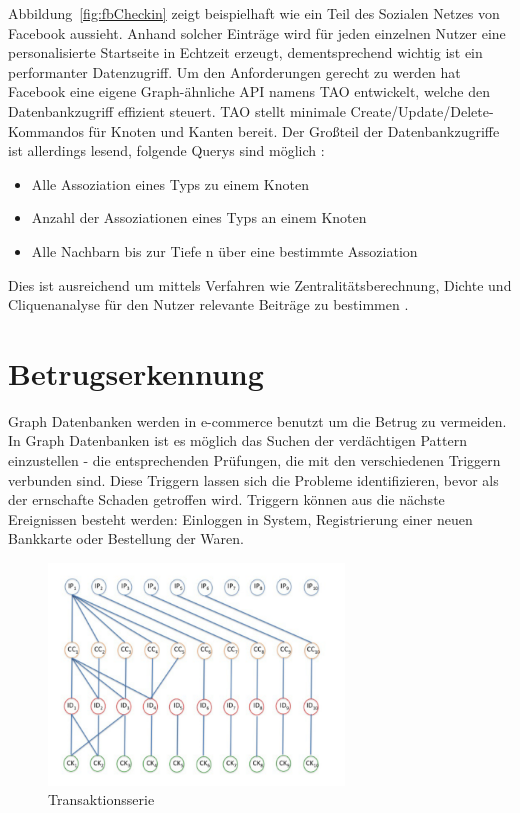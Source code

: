 Abbildung~\ref{fig:fbCheckin} zeigt beispielhaft wie ein Teil des Sozialen Netzes von Facebook aussieht. Anhand solcher Einträge wird für jeden einzelnen Nutzer eine personalisierte Startseite in Echtzeit erzeugt, dementsprechend wichtig ist ein performanter Datenzugriff. Um den Anforderungen gerecht zu werden hat Facebook eine eigene Graph-ähnliche API namens TAO entwickelt, welche den Datenbankzugriff effizient steuert. TAO stellt minimale Create/Update/Delete-Kommandos für Knoten und Kanten bereit. Der Großteil der Datenbankzugriffe ist allerdings lesend, folgende Querys sind möglich \cite{facebookTao}:
\begin{itemize}
	\item Alle Assoziation eines Typs zu einem Knoten
	\item Anzahl der Assoziationen eines Typs an einem Knoten
	\item Alle Nachbarn bis zur Tiefe n über eine bestimmte Assoziation
\end{itemize}
Dies ist ausreichend um mittels Verfahren wie Zentralitätsberechnung, Dichte und Cliquenanalyse für den Nutzer relevante Beiträge zu bestimmen \cite{sozialeNetzwerkanalyse}.


\section{Betrugserkennung}
Graph Datenbanken werden in e-commerce benutzt um die Betrug zu vermeiden. In Graph Datenbanken ist es möglich das Suchen der verdächtigen Pattern einzustellen - die entsprechenden Prüfungen, die mit den verschiedenen Triggern verbunden sind. Diese Triggern lassen sich die Probleme identifizieren, bevor als der ernschafte Schaden getroffen wird. Triggern können aus die nächste Ereignissen besteht werden: Einloggen in System, Registrierung einer neuen Bankkarte oder Bestellung der Waren.
\begin{figure}
	\caption{Transaktionsserie}
	\label{fig:Trs}
	\centering
	\includegraphics[width=0.7\textwidth]{images/Betrugserkennung.png}
\end{figure}

